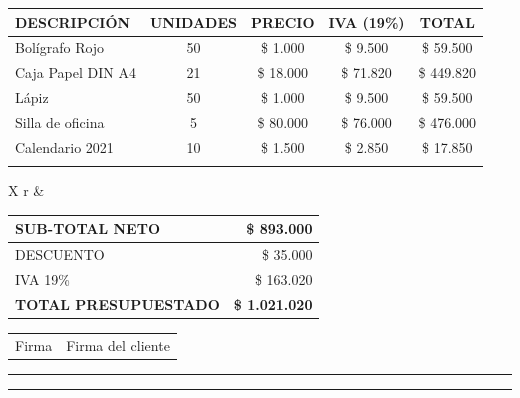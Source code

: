 \documentclass[10pt,a4paper]{article}
\begin{document}
\begin{tabularx}{\textwidth}{|X|c|c|c|c|}
\hline
\textbf{DESCRIPCIÓN} & \textbf{UNIDADES} & \textbf{PRECIO} & \textbf{IVA (19\%)} & \textbf{TOTAL} \\ \hline
Bolígrafo Rojo     & 50 & \$ 1.000  & \$ 9.500  & \$ 59.500  \\
Caja Papel DIN A4  & 21 & \$ 18.000 & \$ 71.820 & \$ 449.820 \\
Lápiz              & 50 & \$ 1.000  & \$ 9.500  & \$ 59.500  \\
Silla de oficina   & 5  & \$ 80.000 & \$ 76.000 & \$ 476.000 \\
Calendario 2021    & 10 & \$ 1.500  & \$ 2.850  & \$ 17.850  \\
\hline
\multicolumn{5}{|c|}{\rule{0pt}{2.5cm}} \\ \hline 
\end{tabularx}

\vspace{0.4cm}

\begin{tabularx}{\textwidth}{X r}
    &
    \begin{tabular}{|l|r|}
    \hline
    SUB-TOTAL NETO & \$ 893.000 \\ \hline
    DESCUENTO & \$ 35.000 \\ \hline
    IVA 19\%  & \$ 163.020 \\ \hline
    \rowcolor{lightgray}
    \textbf{TOTAL PRESUPUESTADO} & \textbf{\$ 1.021.020} \\ \hline
    \end{tabular}
\end{tabularx}
    
\vspace{1.2cm}

\begin{tabularx}{\textwidth}{X X}
\centering Firma & \centering Firma del cliente
\end{tabularx}

\vspace{2cm}

\hrule
\vspace{1pt}
\hrule
\end{document}

